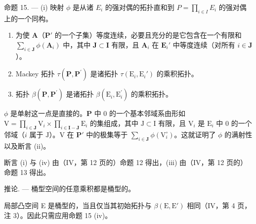 命题 15. --- (i) 映射 \(\phi\) 是从诸 \(E_i\) 的强对偶的拓扑直和到 \(P = \prod_{i \in I} E_i\) 的强对偶上的一个同构。

\begin{enumerate}
\def\labelenumi{(\roman{enumi})}
\setcounter{enumi}{1}
\item
  为使 \(\mathbf{A}\)（\(\mathbf{P}'\) 的一个子集）等度连续，必要且充分的是它包含在一个有限和 \(\sum_{i\in \mathbf{J}}\phi (\mathbf{A}_i)\) 中，其中 \(\mathbf{J}\subset \mathbf{I}\) 有限，且 \(\mathbf{A}_i\) 在 \(\mathbf{E}_i'\) 中等度连续（对所有 \(i\in \mathbf{J}\)）。
\item
  Mackey 拓扑 \(\tau (\mathbf{P},\mathbf{P}^{\prime})\) 是诸拓扑 \(\tau (\mathrm{E}_i,\mathrm{E}_i')\) 的乘积拓扑。
\item
  拓扑 \(\beta (\mathbf{P},\mathbf{P}^{\prime})\) 是诸拓扑 \(\beta (\mathrm{E}_i,\mathrm{E}_i^{\prime})\) 的乘积拓扑。
\end{enumerate}

\(\phi\) 是单射这一点是直接的。\(\mathbf{P}\) 中 0 的一个基本邻域系由形如 \(\mathrm{V} = \prod_{i\in \mathbf{J}}\mathrm{V}_i\times \prod_{i\in \mathbf{I} - \mathbf{J}}\mathrm{E}_i\) 的集组成，其中 \(\mathrm{J}\subset \mathrm{I}\) 有限，且 \(\mathrm{V}_i\) 是 \(\mathrm{E}_i\) 中 0 的一个邻域（\(i\) 属于 \(\mathrm{J}\)）。\(\mathrm{V}\) 在 \(\mathbf{P}'\) 中的极集等于 \(\sum_{i\in \mathbf{J}}\phi (\mathrm{V}_i^\circ)\)。这就证明了 \(\phi\) 的满射性以及断言 (ii)。

断言 (i) 与 (iv) 由（IV，第 12 页的）命题 12 得出，(iii) 由（IV，第 12 页的）命题 13 得出。

推论. --- 桶型空间的任意乘积都是桶型的。

局部凸空间 E 是桶型的，当且仅当其初始拓扑与 \(\beta(\mathrm{E}, \mathrm{E}')\) 相同（IV，第 4 页，注 3）。因此只需应用命题 15 (iv)。

